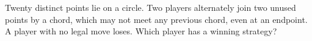 Twenty distinct points lie on a circle. Two players alternately join two unused points by a chord, which may not meet any previous chord, even at an endpoint. A player with no legal move loses. Which player has a winning strategy?
